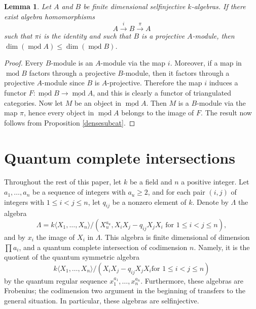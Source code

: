 \documentclass[a4paper]{amsart}
\newtheorem{lemma}[theorem]{Lemma}
\theoremstyle{definition}
\theoremstyle{definition}
\theoremstyle{definition}
\theoremstyle{definition}
\theoremstyle{definition}
\theoremstyle{definition}
\theoremstyle{remark}
\theoremstyle{remark}
\theoremstyle{definition}
\theoremstyle{definition}
\begin{document}
\begin{lemma}\label{subalgebra}
\sloppy Let $A$ and $B$ be finite dimensional selfinjective
$k$-algebras. If there exist algebra homomorphisms
$$A \xrightarrow{i} B \xrightarrow{\pi} A$$
such that $\pi i$ is the identity and such that $B$ is a projective
$A$-module, then $\dim ( \underline{\operatorname{mod}\nolimits} A)  \le \dim (
\underline{\operatorname{mod}\nolimits} B)$.
\end{lemma}

\begin{proof}
Every $B$-module is an $A$-module via the map $i$. Moreover, if a
map in ${\operatorname{mod}\nolimits} B$ factors through a projective $B$-module, then it
factors through a projective $A$-module since $B$ is $A$-projective.
Therefore the map $i$ induces a functor $F \colon \underline{\operatorname{mod}\nolimits} B
\to \underline{\operatorname{mod}\nolimits} A$, and this is clearly a functor of
triangulated categories. Now let $M$ be an object in
$\underline{\operatorname{mod}\nolimits} A$. Then $M$ is a $B$-module via the map $\pi$,
hence every object in $\underline{\operatorname{mod}\nolimits} A$ belongs to the image of
$F$. The result now follows from Proposition \ref{densesubcat}.
\end{proof}

\section{Quantum complete intersections}\label{quantumci}

Throughout the rest of this paper, let $k$ be a field and $n$ a
positive integer. Let $a_1, \dots, a_n$ be a sequence of integers
with $a_u \ge 2$, and for each pair $(i,j)$ of integers with $1 \le
i <j \le n$, let $q_{ij}$ be a nonzero element of $k$. Denote by
$\Lambda$ the algebra
$$\Lambda = k \langle X_1, \dots, X_n \rangle / (X_u^{a_u}, X_iX_j -
q_{ij}X_jX_i \text{ for } 1 \le i <j \le n ),$$ and by $x_i$ the
image of $X_i$ in $\Lambda$. This algebra is finite dimensional of
dimension $\prod a_i$, and a quantum complete intersection of
codimension $n$. Namely, it is the quotient of the quantum symmetric
algebra
$$k \langle X_1, \dots, X_n \rangle / (X_iX_j - q_{ij}X_jX_i \text{
for } 1 \le i <j \le n )$$ by the quantum regular sequence
$x_1^{a_1}, \dots, x_n^{a_n}$. Furthermore, these algebras are
Frobenius; the codimension two argument in the beginning of
\cite[Section 3]{Bergh} transfers to the general situation. In
particular, these algebras are selfinjective.
\end{document}
